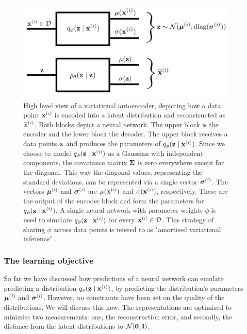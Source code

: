 \begin{figure}
	\centering
	\includegraphics[width=0.6\linewidth]{"vae repr"}
	\caption{High level view of a variational autoencoder, depicting how a data point $\mathbf{x}^{(i)}$ is encoded into a latent distribution and reconstructed as $\widetilde{\mathbf{x}} ^ {(i)}$. Both blocks depict a neural network. The upper block is the encoder and the lower block the decoder. The upper block receives a data points $\mathbf{x}$ and produces the parameters of $q_\phi (\mathbf{z} \mid \mathbf{x}^{(i)})$. Since we choose to model $q_\phi (\mathbf{z} \mid \mathbf{x}^{(i)})$ as a Gaussian with independent components, the covariance matrix $\mathbf{\Sigma}$ is zero everywhere except for the diagonal. This way the diagonal values, representing the standard deviations, can be represented via a single vector $\bm{\sigma}^{(i)}$. The vectors $\bm{\mu}^{(i)}$ and $\bm{\sigma}^{(i)}$ are $\mu(\mathbf{x}^{(i)})$ and $\sigma(\mathbf{x}^{(i)})$, respectively. These are the output of the encoder block and form the parameters for $q_\phi (\mathbf{z} \mid \mathbf{x}^{(i)})$. A single neural network with parameter weights $\phi$ is used to simulate $q_\phi (\mathbf{z} \mid \mathbf{x}^{(i)})$ for every $\mathbf{x}^{(i)} \in \mathcal{D} $. This strategy of sharing $\phi$ across data points is refered to as "amortised variational inference" \cite{kingmaIntroductionVariationalAutoencoders2019}.}
	\label{fig:vae-repr}
\end{figure}

%
%
%
%
%
%

\subsubsection{The learning objective}

So far we have discussed how predictions of a neural network can emulate predicting a distribution $q_\phi (\mathbf{z} \mid \mathbf{x}^{(i)})$, by predicting the distribution's parameters $\bm{\mu}^{(i)}$ and $\bm{\sigma}^{(i)}$. However, no constraints have been set on the quality of the distributions. We will discuss this now. The representations are optimised to minimise two measurements: one, the reconstruction error, and secondly, the distance from the latent distributions to $\mathcal{N}(\bm{\mathbf{0}}, \mathbf{I})$.

